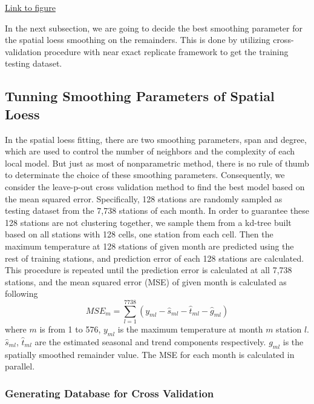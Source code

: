 \begin{framed}
\begin{center}
  \href{../plots/a1950/spafit/d2/span0.015/a1950.spaResid.vs.elev.lon.pdf}
  {Link to figure}
  \label{spafit.elev.lon}
\end{center}
\end{framed}

In the next subsection, we are going to decide the best smoothing parameter for
the spatial loess smoothing on the remainders. This is done by utilizing cross-
validation procedure with near exact replicate framework to get the training 
testing dataset.

\subsection{Tunning Smoothing Parameters of Spatial Loess}

In the spatial loess fitting, there are two smoothing parameters, span and degree,
which are used to control the number of neighbors and the complexity of each 
local model. But just as most of nonparametric method, there is no rule of thumb
to determinate the choice of these smoothing parameters. Consequently, we consider
the leave-p-out cross validation method to find the best model based on the mean 
squared error. Specifically, 128 stations are randomly sampled as testing dataset
from the 7,738 stations of each month. In order to guarantee these 128 stations
are not clustering together, we sample them from a kd-tree built based on all
stations with 128 cells, one station from each cell. Then the maximum temperature
at 128 stations of given month are predicted using the rest of training stations,
and prediction error of each 128 stations are calculated. This procedure is 
repeated until the prediction error is calculated at all 7,738 stations, and the
mean squared error (MSE) of given month is calculated as following
\begin{equation} 
MSE_m = \sum_{l=1}^{7738} \left( y_{ml} - \hat s_{ml} - \hat t_{ml} - \hat g_{ml}
\right) 
\end{equation} 
where $m$ is from 1 to 576, $y_{ml}$ is the maximum temperature at month $m$ 
station $l$. $\hat s_{ml}$, $\hat t_{ml}$ are the estimated seasonal and trend
components respectively. $g_{ml}$ is the spatially smoothed remainder value.
The MSE for each month is calculated in parallel.

\subsubsection{Generating Database for Cross Validation}

